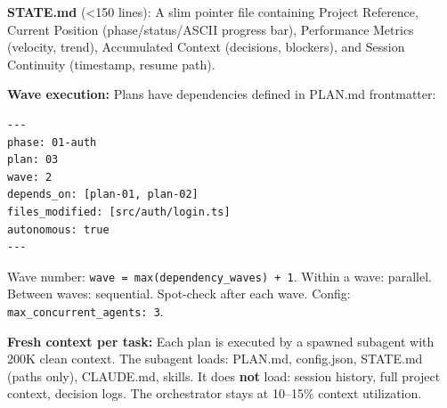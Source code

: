 \documentclass[11pt,a4paper]{article}
\begin{document}
\begin{center}
\end{center}

\textbf{STATE.md} (<150 lines): A slim pointer file containing Project Reference, Current Position (phase/status/ASCII progress bar), Performance Metrics (velocity, trend), Accumulated Context (decisions, blockers), and Session Continuity (timestamp, resume path).

\textbf{Wave execution:} Plans have dependencies defined in PLAN.md frontmatter:

\begin{lstlisting}
---
phase: 01-auth
plan: 03
wave: 2
depends_on: [plan-01, plan-02]
files_modified: [src/auth/login.ts]
autonomous: true
---
\end{lstlisting}

Wave number: \texttt{wave = max(dependency\_waves) + 1}. Within a wave: parallel. Between waves: sequential. Spot-check after each wave. Config: \texttt{max\_concurrent\_agents: 3}.

\textbf{Fresh context per task:} Each plan is executed by a spawned subagent with 200K clean context. The subagent loads: PLAN.md, config.json, STATE.md (paths only), CLAUDE.md, skills. It does \textbf{not} load: session history, full project context, decision logs. The orchestrator stays at 10--15\% context utilization.
\end{document}
